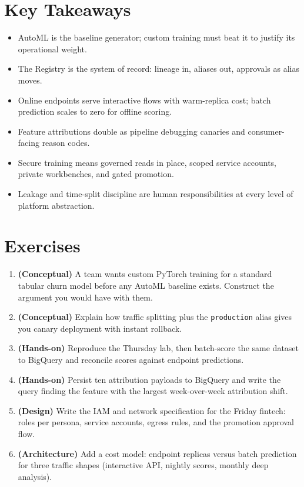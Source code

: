 \section*{Key Takeaways}
\begin{itemize}
    \item AutoML is the baseline generator; custom training must beat it to justify its operational weight.
    \item The Registry is the system of record: lineage in, aliases out, approvals as alias moves.
    \item Online endpoints serve interactive flows with warm-replica cost; batch prediction scales to zero for offline scoring.
    \item Feature attributions double as pipeline debugging canaries and consumer-facing reason codes.
    \item Secure training means governed reads in place, scoped service accounts, private workbenches, and gated promotion.
    \item Leakage and time-split discipline are human responsibilities at every level of platform abstraction.
\end{itemize}

\section{Exercises}
\begin{enumerate}
    \item \textbf{(Conceptual)} A team wants custom PyTorch training for a standard tabular churn model before any AutoML baseline exists. Construct the argument you would have with them.
    \item \textbf{(Conceptual)} Explain how traffic splitting plus the \texttt{production} alias gives you canary deployment with instant rollback.
    \item \textbf{(Hands-on)} Reproduce the Thursday lab, then batch-score the same dataset to BigQuery and reconcile scores against endpoint predictions.
    \item \textbf{(Hands-on)} Persist ten attribution payloads to BigQuery and write the query finding the feature with the largest week-over-week attribution shift.
    \item \textbf{(Design)} Write the IAM and network specification for the Friday fintech: roles per persona, service accounts, egress rules, and the promotion approval flow.
    \item \textbf{(Architecture)} Add a cost model: endpoint replicas versus batch prediction for three traffic shapes (interactive API, nightly scores, monthly deep analysis).
\end{enumerate}
